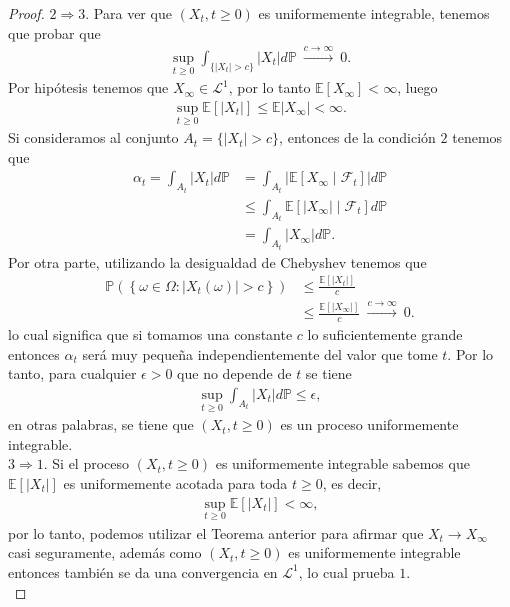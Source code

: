 \begin{proof}
$2 \Rightarrow 3$. Para ver que $(X_t, t \geq 0)$ es uniformemente integrable, tenemos que probar que 
\begin{align*}
\sup_{t \geq 0} \int_{ \{ |X_t| > c \} } |X_t| d \mathbb{P} \ \xrightarrow{c \rightarrow \infty} \ 0.
\end{align*}
Por hipótesis tenemos que $X_{\infty} \in \mathcal{L}^{1}$, por lo tanto $\mathbb{E}[X_{\infty}] < \infty$, luego
\begin{align*}
\sup_{t \geq 0} \mathbb{E}[|X_t|] \leq \mathbb{E}{|X_{\infty}|} < \infty.
\end{align*}
Si consideramos al conjunto $A_t = \{ |X_t| > c \}$, entonces de la condición $2$ tenemos que 
\begin{align*}
\alpha_t = \int_{A_t} |X_t| d \mathbb{P} & = \int_{A_t} |\mathbb{E}[ X_{\infty} \mid \mathcal{F}_t ]| d \mathbb{P} \\
& \leq \int_{A_t} \mathbb{E}[ | X_{\infty} | \mid \mathcal{F}_t ] d \mathbb{P} \\
& = \int_{A_t} | X_{\infty} | d \mathbb{P}.
\end{align*}
Por otra parte, utilizando la desigualdad de Chebyshev tenemos que
\begin{align*}
\mathbb{P} \left( \left\{ \omega \in \Omega : |X_t (\omega)| > c \right\} \right) & \leq \frac{\mathbb{E}[|X_t|]}{c} \\
& \leq \frac{\mathbb{E}[|X_{\infty}|]}{c} \ \xrightarrow{c \rightarrow \infty} \ 0.
\end{align*}
lo cual significa que si tomamos una constante $c$ lo suficientemente grande entonces $\alpha_t$ será muy pequeña independientemente del valor que tome $t$. Por lo tanto, para cualquier $\epsilon > 0$ que no depende de $t$ se tiene
\begin{align*}
\sup_{t \geq 0} \int_{A_t} |X_t| d \mathbb{P} \leq \epsilon,
\end{align*}
en otras palabras, se tiene que $(X_t, t \geq 0)$ es un proceso uniformemente integrable. \\

$3 \Rightarrow 1$. Si el proceso $(X_t, t \geq 0)$ es uniformemente integrable sabemos que $\mathbb{E}[|X_t|]$ es uniformemente acotada para toda $t \geq 0$, es decir, 
\begin{align*}
\sup_{t \geq 0} \mathbb{E}[|X_t|] < \infty,
\end{align*}
por lo tanto, podemos utilizar el Teorema anterior para afirmar que $X_t \rightarrow X_{\infty}$ casi seguramente, además como $(X_t, t \geq 0)$ es uniformemente integrable entonces también se da una convergencia en $\mathcal{L}^{1}$, lo cual prueba $1$. \\


\end{proof}
